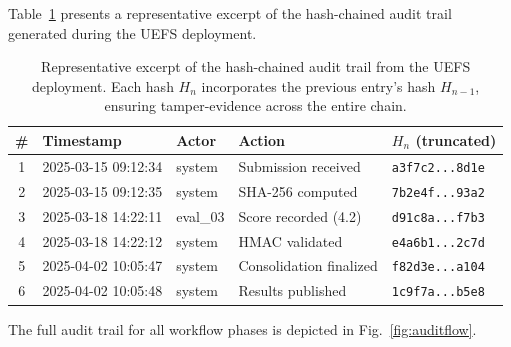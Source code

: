 \documentclass[preprint,12pt,a4paper]{elsarticle}
\begin{document}
Table~\ref{tab:auditsample} presents a representative excerpt of the hash-chained audit trail generated during the UEFS deployment.

\begin{table}[H]
\centering
\footnotesize
\begin{tabular}{|c|l|l|l|l|}
\hline
\textbf{\#} & \textbf{Timestamp} & \textbf{Actor} & \textbf{Action} & \textbf{$H_n$ (truncated)} \\
\hline
1 & 2025-03-15 09:12:34 & system & Submission received & \texttt{a3f7c2...8d1e} \\
\hline
2 & 2025-03-15 09:12:35 & system & SHA-256 computed & \texttt{7b2e4f...93a2} \\
\hline
3 & 2025-03-18 14:22:11 & eval\_03 & Score recorded (4.2) & \texttt{d91c8a...f7b3} \\
\hline
4 & 2025-03-18 14:22:12 & system & HMAC validated & \texttt{e4a6b1...2c7d} \\
\hline
5 & 2025-04-02 10:05:47 & system & Consolidation finalized & \texttt{f82d3e...a104} \\
\hline
6 & 2025-04-02 10:05:48 & system & Results published & \texttt{1c9f7a...b5e8} \\
\hline
\end{tabular}
\caption{Representative excerpt of the hash-chained audit trail from the UEFS deployment. Each hash $H_n$ incorporates the previous entry's hash $H_{n-1}$, ensuring tamper-evidence across the entire chain.}
\label{tab:auditsample}
\end{table}

The full audit trail for all workflow phases is depicted in Fig.~\ref{fig:auditflow}.
\end{document}
